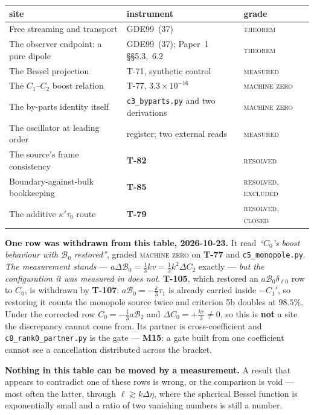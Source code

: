 \begin{center}\small
\begin{tabularx}{\textwidth}{@{}>{\raggedright\arraybackslash}X l l@{}}
\toprule
\textbf{site} & \textbf{instrument} & \textbf{grade} \\
\midrule
Free streaming and transport & GDE99~(37) & \textsc{theorem} \\
The observer endpoint: a pure dipole & GDE99~(37); Paper~1 \S\S5.3,~6.2 & \textsc{theorem} \\
The Bessel projection & T-71, synthetic control & \textsc{measured} \\
The $C_1$--$C_2$ boost relation & T-77, $3.3\times10^{-16}$ & \textsc{machine zero} \\
The by-parts identity itself & \texttt{c3\_byparts.py} and two derivations & \textsc{machine zero} \\
The oscillator at leading order & register; two external reads & \textsc{measured} \\
The source's frame consistency & \textbf{T-82} & \textsc{resolved} \\
Boundary-against-bulk bookkeeping & \textbf{T-85} & \textsc{resolved, excluded} \\
The additive $\kappa'\tau_0$ route & \textbf{T-79} & \textsc{resolved, closed} \\
\bottomrule
\end{tabularx}
\end{center}

\textbf{One row was withdrawn from this table, 2026-10-23.} It read
\emph{``$C_0$'s boost behaviour with $\mathcal B_0$ restored''}, graded
\textsc{machine zero} on \textbf{T-77} and \texttt{c5\_monopole.py}.
\emph{The measurement stands} --- $a\Delta\mathcal B_0=\tfrac13kv=\tfrac13k^2
\Delta C_2$ exactly --- \emph{but the configuration it was measured in does
not}. \textbf{T-105}, which restored an $a\mathcal B_0\delta_{\ell0}$ row to
$C_0$, is withdrawn by \textbf{T-107}: $a\mathcal B_0=-\tfrac k3\tau_1$ is
already carried inside $-C_1'$, so restoring it counts the monopole source
twice and criterion 5b doubles at $98.5\%$. Under the corrected row
$C_0=-\tfrac13a\mathcal B_2$ and $\Delta C_0=+\tfrac{kv}{3}\neq0$, so this is
\textbf{not} a site the discrepancy cannot come from. Its partner is
cross-coefficient and \texttt{c8\_rank0\_partner.py} is the gate ---
\textbf{M15}: a gate built from one coefficient cannot see a cancellation
distributed across the bracket.

\noindent
\textbf{Nothing in this table can be moved by a measurement.} A result that
appears to contradict one of these rows is wrong, or the comparison is void ---
most often the latter, through $\ell\gtrsim k\Delta\eta$, where the spherical
Bessel function is exponentially small and a ratio of two vanishing numbers is
still a number.

